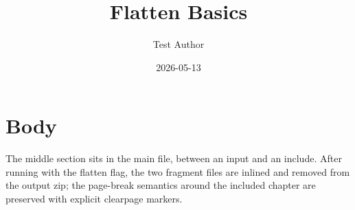 \documentclass{article}
\title{Flatten Basics}
\author{Test Author}
\date{2026-05-13}
\begin{document}
\maketitle



\section{Body}
The middle section sits in the main file, between an input and an
include. After running with the flatten flag, the two fragment files are
inlined and removed from the output zip; the page-break semantics around
the included chapter are preserved with explicit clearpage markers.


\end{document}
